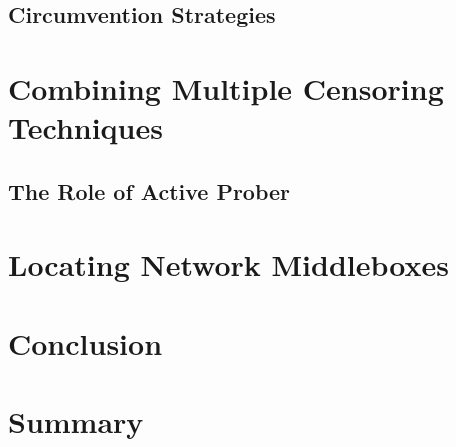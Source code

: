 \subsection{Circumvention Strategies}

\section{Combining Multiple Censoring Techniques}

\subsection{The Role of Active Prober}

\section{Locating Network Middleboxes}

\section{Conclusion}

\section{Summary}
